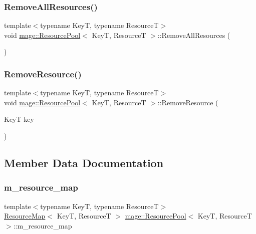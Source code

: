 \subsubsection{\texorpdfstring{Remove\+All\+Resources()}{RemoveAllResources()}}
{\footnotesize\ttfamily template$<$typename KeyT, typename ResourceT$>$ \\
void \hyperlink{classmage_1_1_resource_pool}{mage\+::\+Resource\+Pool}$<$ KeyT, ResourceT $>$\+::Remove\+All\+Resources (\begin{DoxyParamCaption}{ }\end{DoxyParamCaption})}

\hypertarget{classmage_1_1_resource_pool_acda87b2a5cc6ea3880f40df0ac6fb4d9}{}\label{classmage_1_1_resource_pool_acda87b2a5cc6ea3880f40df0ac6fb4d9} 
\subsubsection{\texorpdfstring{Remove\+Resource()}{RemoveResource()}}
{\footnotesize\ttfamily template$<$typename KeyT, typename ResourceT$>$ \\
void \hyperlink{classmage_1_1_resource_pool}{mage\+::\+Resource\+Pool}$<$ KeyT, ResourceT $>$\+::Remove\+Resource (\begin{DoxyParamCaption}\item[{KeyT}]{key }\end{DoxyParamCaption})}



\subsection{Member Data Documentation}
\hypertarget{classmage_1_1_resource_pool_aecc46ecca2a54ef2816137276b1d73cd}{}\label{classmage_1_1_resource_pool_aecc46ecca2a54ef2816137276b1d73cd} 
\subsubsection{\texorpdfstring{m\+\_\+resource\+\_\+map}{m\_resource\_map}}
{\footnotesize\ttfamily template$<$typename KeyT, typename ResourceT$>$ \\
\hyperlink{namespacemage_a0b0a087ad59dd4aa0b4b538d8caec216}{Resource\+Map}$<$ KeyT, ResourceT $>$ \hyperlink{classmage_1_1_resource_pool}{mage\+::\+Resource\+Pool}$<$ KeyT, ResourceT $>$\+::m\+\_\+resource\+\_\+map\hspace{0.3cm}{\ttfamily [private]}}

